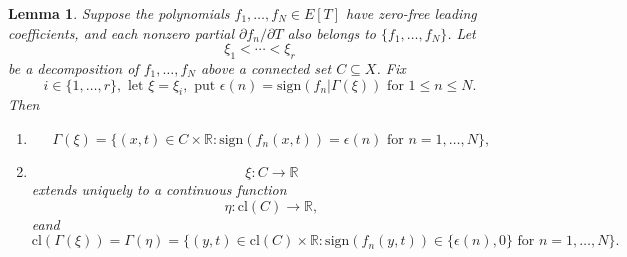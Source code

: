\documentclass[12pt]{article}
\theoremstyle{mythm}
\newtheorem{lemma}{Lemma}[section]
\begin{document}
\begin{lemma}
Suppose the polynomials \( f_1, \ldots, f_N \in E[T] \) have zero-free leading coefficients, and each nonzero partial \(\partial f_n / \partial T\) also belongs to \(\{f_1, \ldots, f_N\}\). Let  
\[\xi_1 < \cdots < \xi_r\]  
be a decomposition of \( f_1, \ldots, f_N \) above a connected set \( C \subseteq X \). Fix  
\[i \in \{1, \ldots, r\}, \text{ let } \xi = \xi_i, \text{ put } \epsilon(n) = \mathrm{sign}(f_n | \Gamma(\xi)) \text{ for } 1 \leq n \leq N.\]  
Then  

\begin{enumerate}
    \item[(a)] 
    \[\Gamma(\xi) = \{(x, t) \in C \times \mathbb{R} : \mathrm{sign}(f_n(x, t)) = \epsilon(n) \text{ for } n = 1, \ldots, N\},\]
    
    \item[(b)] 
    \[\xi : C \to \mathbb{R} \] extends uniquely to a continuous function \[\eta : \mathrm{cl}(C) \to \mathbb{R}, \]eand \[ \mathrm{cl}(\Gamma(\xi)) = \Gamma(\eta) = \{(y, t) \in \mathrm{cl}(C) \times \mathbb{R} : \mathrm{sign}(f_n(y, t)) \in \{\epsilon(n), 0\} \text{ for } n = 1, \ldots, N\}.\]
\end{enumerate}
\end{lemma}
\end{document}
